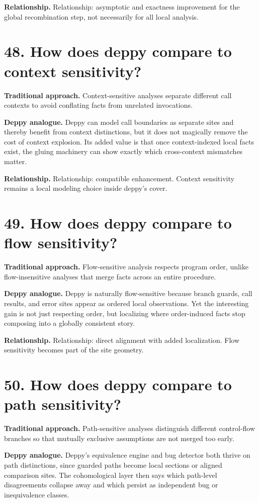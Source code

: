 \documentclass[11pt,openany]{book}
\begin{document}
\textbf{Relationship.} Relationship: asymptotic and exactness improvement for the global recombination step, not necessarily for all local analysis.

\section*{48. How does deppy compare to context sensitivity?}
\textbf{Traditional approach.} Context-sensitive analyses separate different call contexts to avoid conflating facts from unrelated invocations.

\textbf{Deppy analogue.} Deppy can model call boundaries as separate sites and thereby benefit from context distinctions, but it does not magically remove the cost of context explosion. Its added value is that once context-indexed local facts exist, the gluing machinery can show exactly which cross-context mismatches matter.

\textbf{Relationship.} Relationship: compatible enhancement. Context sensitivity remains a local modeling choice inside deppy's cover.

\section*{49. How does deppy compare to flow sensitivity?}
\textbf{Traditional approach.} Flow-sensitive analysis respects program order, unlike flow-insensitive analyses that merge facts across an entire procedure.

\textbf{Deppy analogue.} Deppy is naturally flow-sensitive because branch guards, call results, and error sites appear as ordered local observations. Yet the interesting gain is not just respecting order, but localizing where order-induced facts stop composing into a globally consistent story.

\textbf{Relationship.} Relationship: direct alignment with added localization. Flow sensitivity becomes part of the site geometry.

\section*{50. How does deppy compare to path sensitivity?}
\textbf{Traditional approach.} Path-sensitive analyses distinguish different control-flow branches so that mutually exclusive assumptions are not merged too early.

\textbf{Deppy analogue.} Deppy's equivalence engine and bug detector both thrive on path distinctions, since guarded paths become local sections or aligned comparison sites. The cohomological layer then says which path-level disagreements collapse away and which persist as independent bug or inequivalence classes.
\end{document}
